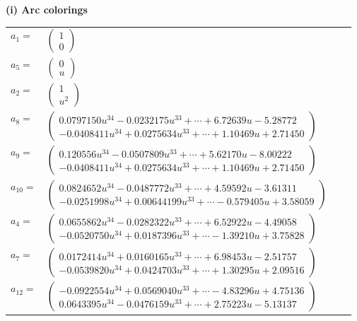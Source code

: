 \documentclass[1p]{elsarticle_modified}
\theoremstyle{definition}
\begin{document}
\flushleft \textbf{(i) Arc colorings}\\
\begin{tabular}{m{7pt} m{180pt} m{7pt} m{180pt} }
\flushright $a_{1}=$&$\begin{pmatrix}1\\0\end{pmatrix}$ \\
\flushright $a_{5}=$&$\begin{pmatrix}0\\u\end{pmatrix}$ \\
\flushright $a_{2}=$&$\begin{pmatrix}1\\u^2\end{pmatrix}$ \\
\flushright $a_{8}=$&$\begin{pmatrix}0.0797150 u^{34}-0.0232175 u^{33}+\cdots+6.72639 u-5.28772\\-0.0408411 u^{34}+0.0275634 u^{33}+\cdots+1.10469 u+2.71450\end{pmatrix}$ \\
\flushright $a_{9}=$&$\begin{pmatrix}0.120556 u^{34}-0.0507809 u^{33}+\cdots+5.62170 u-8.00222\\-0.0408411 u^{34}+0.0275634 u^{33}+\cdots+1.10469 u+2.71450\end{pmatrix}$ \\
\flushright $a_{10}=$&$\begin{pmatrix}0.0824652 u^{34}-0.0487772 u^{33}+\cdots+4.59592 u-3.61311\\-0.0251998 u^{34}+0.00644199 u^{33}+\cdots-0.579405 u+3.58059\end{pmatrix}$ \\
\flushright $a_{4}=$&$\begin{pmatrix}0.0655862 u^{34}-0.0282322 u^{33}+\cdots+6.52922 u-4.49058\\-0.0520750 u^{34}+0.0187396 u^{33}+\cdots-1.39210 u+3.75828\end{pmatrix}$ \\
\flushright $a_{7}=$&$\begin{pmatrix}0.0172414 u^{34}+0.0160165 u^{33}+\cdots+6.98453 u-2.51757\\-0.0539820 u^{34}+0.0424703 u^{33}+\cdots+1.30295 u+2.09516\end{pmatrix}$ \\
\flushright $a_{12}=$&$\begin{pmatrix}-0.0922554 u^{34}+0.0569040 u^{33}+\cdots-4.83296 u+4.75136\\0.0643395 u^{34}-0.0476159 u^{33}+\cdots+2.75223 u-5.13137\end{pmatrix}$ \\

\end{tabular}
\end{document}
